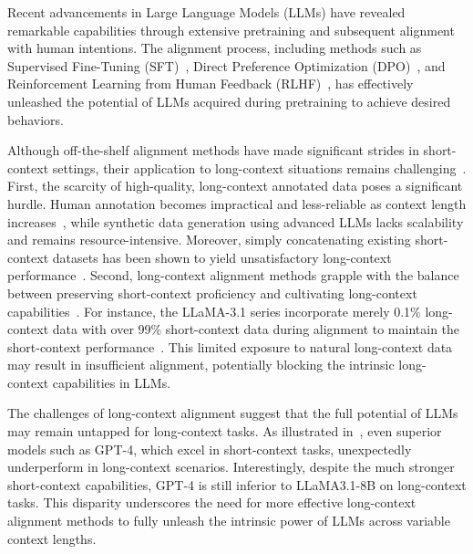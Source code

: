 Recent advancements in Large Language Models (LLMs) have revealed remarkable capabilities through extensive pretraining and subsequent alignment with human intentions. The alignment process, including methods such as Supervised Fine-Tuning (SFT)~\citep{wei2022finetuned}, Direct Preference Optimization (DPO)~\citep{Rafailov2023DirectPO}, and Reinforcement Learning from Human Feedback (RLHF)~\citep{christiano2017deep, Ouyang2022TrainingLM, stiennon2020learning}, has effectively unleashed the potential of LLMs acquired during pretraining to achieve desired behaviors. 

Although off-the-shelf alignment methods have made significant strides in short-context settings, their application to long-context situations remains challenging~\citep{bai2024longalign}. First, the scarcity of high-quality, long-context annotated data poses a significant hurdle. Human annotation becomes impractical and less-reliable as context length increases~\citep{dubey2024llama3herdmodels}, while synthetic data generation using advanced LLMs lacks scalability and remains resource-intensive. Moreover, simply concatenating existing short-context datasets has been shown to yield unsatisfactory long-context performance~\citep{liu2023world}.
Second, long-context alignment methods grapple with the balance between preserving short-context proficiency and cultivating long-context capabilities~\citep{liu2023world}.
For instance, the LLaMA-3.1 series incorporate merely 0.1\% long-context data with over 99\% short-context data during alignment to maintain the short-context performance~\citep{liu2023world}. This limited exposure to natural long-context data may result in insufficient alignment, potentially blocking the intrinsic long-context capabilities in LLMs.

The challenges of long-context alignment suggest that the full potential of LLMs may remain untapped for long-context tasks. As illustrated in~, even superior models such as GPT-4, which excel in short-context tasks, unexpectedly underperform in long-context scenarios.
Interestingly, despite the much stronger short-context capabilities, GPT-4 is still inferior to LLaMA3.1-8B on long-context tasks. This disparity underscores the need for more effective long-context alignment methods to fully unleash the intrinsic power of LLMs across variable context lengths.

